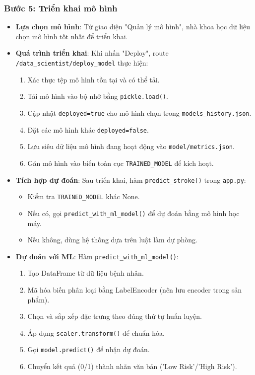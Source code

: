 ﻿\documentclass{article}
\begin{document}
\subsubsection{Bước 5: Triển khai mô hình}
\begin{itemize}
    \item \textbf{Lựa chọn mô hình}: Từ giao diện "Quản lý mô hình", nhà khoa học dữ liệu chọn mô hình tốt nhất để triển khai.
    
    \item \textbf{Quá trình triển khai}: Khi nhấn "Deploy", route \texttt{/data\_scientist/deploy\_model} thực hiện:
    \begin{enumerate}
        \item Xác thực tệp mô hình tồn tại và có thể tải.
        \item Tải mô hình vào bộ nhớ bằng \texttt{pickle.load()}.
        \item Cập nhật \texttt{deployed=true} cho mô hình chọn trong \texttt{models\_history.json}.
        \item Đặt các mô hình khác \texttt{deployed=false}.
        \item Lưu siêu dữ liệu mô hình đang hoạt động vào \texttt{model/metrics.json}.
        \item Gán mô hình vào biến toàn cục \texttt{TRAINED\_MODEL} để kích hoạt.
    \end{enumerate}
    
    \item \textbf{Tích hợp dự đoán}: Sau triển khai, hàm \texttt{predict\_stroke()} trong \texttt{app.py}:
    \begin{itemize}
        \item Kiểm tra \texttt{TRAINED\_MODEL} khác None.
        \item Nếu có, gọi \texttt{predict\_with\_ml\_model()} để dự đoán bằng mô hình học máy.
        \item Nếu không, dùng hệ thống dựa trên luật làm dự phòng.
    \end{itemize}
    
    \item \textbf{Dự đoán với ML}: Hàm \texttt{predict\_with\_ml\_model()}:
    \begin{enumerate}
        \item Tạo DataFrame từ dữ liệu bệnh nhân.
        \item Mã hóa biến phân loại bằng LabelEncoder (nên lưu encoder trong sản phẩm).
        \item Chọn và sắp xếp đặc trưng theo đúng thứ tự huấn luyện.
        \item Áp dụng \texttt{scaler.transform()} để chuẩn hóa.
        \item Gọi \texttt{model.predict()} để nhận dự đoán.
        \item Chuyển kết quả (0/1) thành nhãn văn bản ('Low Risk'/'High Risk').
    \end{enumerate}
\end{itemize}
\end{document}
